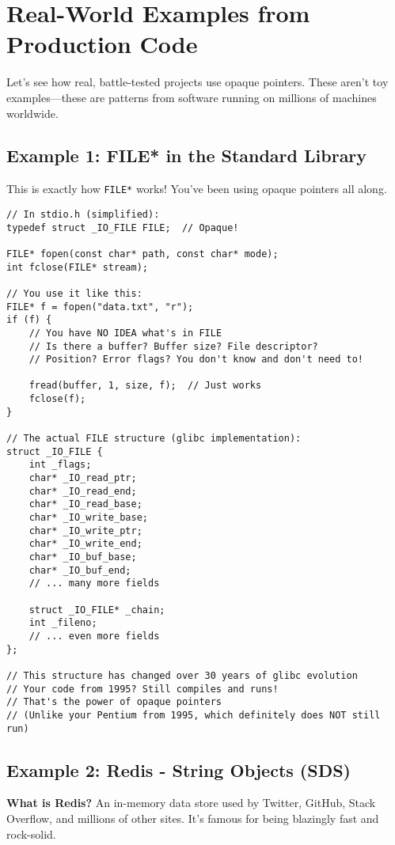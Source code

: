 \section{Real-World Examples from Production Code}

Let's see how real, battle-tested projects use opaque pointers. These aren't toy examples---these are patterns from software running on millions of machines worldwide.

\subsection{Example 1: FILE* in the Standard Library}

This is exactly how \texttt{FILE*} works! You've been using opaque pointers all along.

\begin{lstlisting}
// In stdio.h (simplified):
typedef struct _IO_FILE FILE;  // Opaque!

FILE* fopen(const char* path, const char* mode);
int fclose(FILE* stream);

// You use it like this:
FILE* f = fopen("data.txt", "r");
if (f) {
    // You have NO IDEA what's in FILE
    // Is there a buffer? Buffer size? File descriptor?
    // Position? Error flags? You don't know and don't need to!

    fread(buffer, 1, size, f);  // Just works
    fclose(f);
}

// The actual FILE structure (glibc implementation):
struct _IO_FILE {
    int _flags;
    char* _IO_read_ptr;
    char* _IO_read_end;
    char* _IO_read_base;
    char* _IO_write_base;
    char* _IO_write_ptr;
    char* _IO_write_end;
    char* _IO_buf_base;
    char* _IO_buf_end;
    // ... many more fields

    struct _IO_FILE* _chain;
    int _fileno;
    // ... even more fields
};

// This structure has changed over 30 years of glibc evolution
// Your code from 1995? Still compiles and runs!
// That's the power of opaque pointers
// (Unlike your Pentium from 1995, which definitely does NOT still run)
\end{lstlisting}

\subsection{Example 2: Redis - String Objects (SDS)}

\textbf{What is Redis?} An in-memory data store used by Twitter, GitHub, Stack Overflow, and millions of other sites. It's famous for being blazingly fast and rock-solid.

